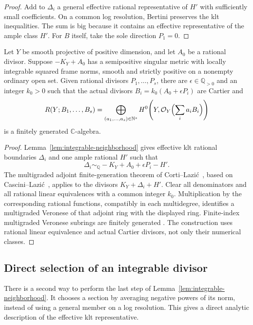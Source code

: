 \begin{proof}
Add to $\Delta_i$ a general effective rational representative of $H'$
with sufficiently small coefficients.  On a common log resolution,
Bertini preserves the klt inequalities.  The sum is big because it
contains an effective representative of the ample class $H'$.
For $B$ itself, take the sole direction $P_1=0$.
\end{proof}

\begin{theorem}
\label{thm:correction-ring}
Let $Y$ be smooth projective of positive dimension, and let $A_0$ be
a rational divisor.  Suppose $-K_Y+A_0$ has a semipositive singular
metric with locally integrable squared frame norms, smooth and
strictly positive on a nonempty ordinary open set.
Given rational divisors $P_1,\ldots,P_s$, there are
$\epsilon\in\mathbb Q_{>0}$ and an integer $k_0>0$ such that the
actual divisors $B_i=k_0(A_0+\epsilon P_i)$ are Cartier and
\[
 R(Y;B_1,\ldots,B_s)=
 \bigoplus_{(a_1,\ldots,a_s)\in\mathbb N^s}
 H^0\!\left(Y,\mathcal O_Y\Bigl(\sum_i a_iB_i\Bigr)\right)
\]
is a finitely generated $\mathbb C$-algebra.
\end{theorem}

\begin{proof}
Lemma~\ref{lem:integrable-neighborhood} gives effective klt rational
boundaries $\Delta_i$ and one ample rational $H'$ such that
\[
 \Delta_i\sim_{\mathbb Q}-K_Y+A_0+\epsilon P_i-H'.
\]
The multigraded adjoint finite-generation theorem of
Corti--Lazi\'c~\cite[Theorem 3.2(1)]{CortiLazic2013}, based on
Cascini--Lazi\'c~\cite{CasciniLazic2012}, applies to the divisors
$K_Y+\Delta_i+H'$.  Clear all denominators and all rational linear
equivalences with a common integer $k_0$.  Multiplication by the
corresponding rational functions, compatibly in each multidegree,
identifies a multigraded Veronese of that adjoint ring with the displayed
ring.  Finite-index multigraded Veronese subrings are finitely generated
\cite[Lemma 3.1]{CortiLazic2013}.
The construction uses rational linear equivalence and actual Cartier
divisors, not only their numerical classes.
\end{proof}

\subsection{Direct selection of an integrable divisor}
\label{subsec:bergman-selection}

There is a second way to perform the last step of
Lemma~\ref{lem:integrable-neighborhood}.  It chooses a section by
averaging negative powers of its norm, instead of using a general
member on a log resolution.  This gives a direct analytic description
of the effective klt representative.

